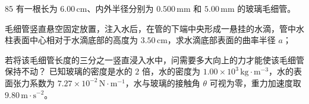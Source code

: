 \begin{problem}[第34届物理决赛][毛细管水滴]{85}
    有一根长为 $6.00\,\mathrm{cm}$、内外半径分别为 $0.500\,\mathrm{mm}$ 和 $5.00\,\mathrm{mm}$ 的玻璃毛细管。
    \begin{subproblem}
        \begin{subsubproblem}
            毛细管竖直悬空固定放置，注入水后，在管的下端中央形成一悬挂的水滴，管中水柱表面中心相对于水滴底部的高度为 $3.50\,\mathrm{cm}$，求水滴底部表面的曲率半径 $a$；
        \end{subsubproblem}
        \begin{subsubproblem}
            若将该毛细管长度的三分之一竖直浸入水中，问需要多大向上的力才能使该毛细管保持不动？
            已知玻璃的密度是水的 $2$ 倍，水的密度为 $1.00\times10^{3}\,\mathrm{kg\cdot m^{-3}}$，水的表面张力系数为 $7.27\times10^{-2}\,\mathrm{N\cdot m^{-1}}$，水与玻璃的接触角 $\theta$ 可视为零，重力加速度取 $9.80\,\mathrm{m\cdot s^{-2}}$。
        \end{subsubproblem}
    \end{subproblem}
\end{problem}